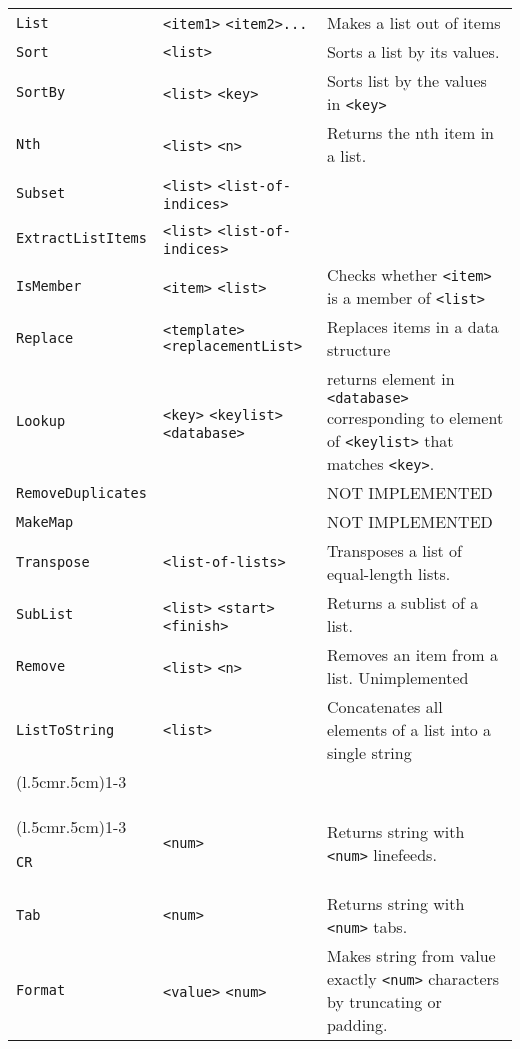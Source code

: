 \begin{longtable}{p{3cm}p{3cm}p{6cm}}
\verb+List+ &\verb+<item1>+ \verb+<item2>...+ &Makes a list out of items\\ 
\verb+Sort+ &\verb+<list>+ &Sorts a list by its values. \\ 
\verb+SortBy+ &\verb+<list>+ \verb+<key>+ & Sorts list by the values in \verb+<key>+ \\ 
\verb+Nth+ &\verb+<list>+ \verb+<n>+ &Returns the nth item in a list.\\ 
\verb+Subset+ &\verb+<list>+ \verb+<list-of-indices>+ & \\ 
\verb+ExtractListItems+ &\verb+<list>+ \verb+<list-of-indices>+ & \\ 
\verb+IsMember+ &\verb+<item>+ \verb+<list>+ & Checks whether \verb+<item>+ is a member of \verb+<list>+ \\ 
\verb+Replace+ &\verb+<template>+ \verb+<replacementList>+ & Replaces items in a data structure\\ 
\verb+Lookup+& \verb+<key>+ \verb+<keylist>+ \verb+<database>+&returns
element in \verb+<database>+ corresponding to element of
\verb+<keylist>+ that matches \verb+<key>+.\\
\verb+RemoveDuplicates+ & & NOT IMPLEMENTED\\ 
\verb+MakeMap+ & & NOT IMPLEMENTED\\ 
\verb+Transpose+ &\verb+<list-of-lists>+ &Transposes a list of equal-length lists.\\ 
\verb+SubList+ &\verb+<list>+ \verb+<start>+ \verb+<finish>+ & Returns a sublist of a list.\\ 
\verb+Remove+ &\verb+<list>+ \verb+<n>+ & Removes an item from a list. Unimplemented\\ 
\verb+ListToString+ &\verb+<list>+ & Concatenates all elements of a list into a single string\\

\addlinespace[0.2cm] 
\cmidrule(l{.5cm}r{.5cm}){1-3} 
\multicolumn{3}{c}{\textbf{String Management Functions}}\\ 
\cmidrule(l{.5cm}r{.5cm}){1-3} 

\verb+CR+ &\verb+<num>+ & Returns string with  \verb+<num>+ linefeeds.\\
\verb+Tab+ &\verb+<num>+ & Returns string with  \verb+<num>+ tabs.\\
\verb+Format+ &\verb+<value>+ \verb+<num>+ & Makes string from value
exactly \verb+<num>+ characters by truncating or padding.\\


\end{longtable}
